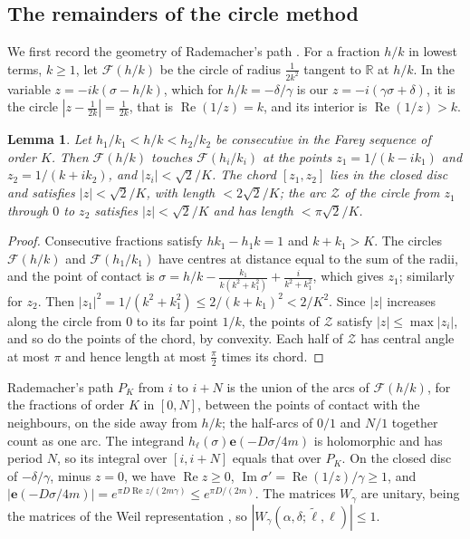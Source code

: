 \documentclass[11pt]{amsart}
\numberwithin{equation}{section}
\theoremstyle{plain}
\newtheorem{lem}[thm]{Lemma}
\theoremstyle{definition}
\theoremstyle{remark}
\newcommand{\R}{\mathbb{R}}
\newcommand{\e}{\mathbf{e}}
\begin{document}
\subsection{The remainders of the circle method}\label{app:limit}
We first record the geometry of Rademacher's path \cite{Rad43}. For a fraction $h/k$ in lowest terms, $k\ge1$, let $\mathcal F(h/k)$ be the circle of radius $\frac1{2k^2}$ tangent to $\R$ at $h/k$. In the variable $z=-ik(\sigma-h/k)$, which for $h/k=-\delta/\gamma$ is our $z=-i(\gamma\sigma+\delta)$, it is the circle $|z-\frac1{2k}|=\frac1{2k}$, that is $\operatorname{Re}(1/z)=k$, and its interior is $\operatorname{Re}(1/z)>k$.

\begin{lem}\label{lem:ford}
Let $h_1/k_1<h/k<h_2/k_2$ be consecutive in the Farey sequence of order $K$. Then $\mathcal F(h/k)$ touches $\mathcal F(h_i/k_i)$ at the points $z_1=1/(k-ik_1)$ and $z_2=1/(k+ik_2)$, and $|z_i|<\sqrt2/K$. The chord $[z_1,z_2]$ lies in the closed disc and satisfies $|z|<\sqrt2/K$, with length $<2\sqrt2/K$; the arc $\mathcal Z$ of the circle from $z_1$ through $0$ to $z_2$ satisfies $|z|<\sqrt2/K$ and has length $<\pi\sqrt2/K$.
\end{lem}

\begin{proof}
Consecutive fractions satisfy $hk_1-h_1k=1$ and $k+k_1>K$. The circles $\mathcal F(h/k)$ and $\mathcal F(h_1/k_1)$ have centres at distance equal to the sum of the radii, and the point of contact is $\sigma=h/k-\frac{k_1}{k(k^2+k_1^2)}+\frac{i}{k^2+k_1^2}$, which gives $z_1$; similarly for $z_2$. Then $|z_1|^2=1/(k^2+k_1^2)\le2/(k+k_1)^2<2/K^2$. Since $|z|$ increases along the circle from $0$ to its far point $1/k$, the points of $\mathcal Z$ satisfy $|z|\le\max|z_i|$, and so do the points of the chord, by convexity. Each half of $\mathcal Z$ has central angle at most $\pi$ and hence length at most $\frac\pi2$ times its chord.
\end{proof}

Rademacher's path $P_K$ from $i$ to $i+N$ is the union of the arcs of $\mathcal F(h/k)$, for the fractions of order $K$ in $[0,N]$, between the points of contact with the neighbours, on the side away from $h/k$; the half-arcs of $0/1$ and $N/1$ together count as one arc. The integrand $h_\ell(\sigma)\e(-D\sigma/4m)$ is holomorphic and has period $N$, so its integral over $[i,i+N]$ equals that over $P_K$. On the closed disc of $-\delta/\gamma$, minus $z=0$, we have $\operatorname{Re}z\ge0$, $\operatorname{Im}\sigma'=\operatorname{Re}(1/z)/\gamma\ge1$, and $|\e(-D\sigma/4m)|=e^{\pi D\operatorname{Re}z/(2m\gamma)}\le e^{\pi D/(2m)}$. The matrices $W_\gamma$ are unitary, being the matrices of the Weil representation \cite[\S5]{EZ85}, so $|W_\gamma(\alpha,\delta;\tilde\ell,\ell)|\le1$.
\end{document}
